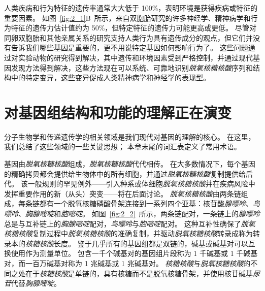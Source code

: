 人类疾病和行为特征的遗传率通常大大低于 100\%，表明环境是获得疾病或特征的重要因素。
如图~\ref{fig:2_1}B~所示，来自双胞胎研究的许多神经学、精神病学和行为特征的遗传力估计值约为 50\%，但特定特征的遗传力可能更高或更低。
尽管对同卵双胞胎和其他亲属关系的研究支持人类行为具有遗传成分的观点，但它们并没有告诉我们哪些基因是重要的，更不用说特定基因如何影响行为了。
这些问题通过对实验动物的研究得到解决，其中遗传和环境因素受到严格控制，并通过现代基因发现方法得到解决，这些方法现在可以系统、可靠地识别\textit{脱氧核糖核酸}序列和结构中的特定变异，这些变异促成人类精神病学和神经学的表现型。



\section{对基因组结构和功能的理解正在演变}

分子生物学和传递遗传学的相关领域是我们现代对基因的理解的核心。
在这里，我们总结了这些领域的一些关键思想；
本章末尾的词汇表定义了常用术语。


基因由\textit{脱氧核糖核酸}组成，\textit{脱氧核糖核酸}代代相传。
在大多数情况下，每个基因的精确拷贝都会提供给生物体中的所有细胞，并通过\textit{脱氧核糖核酸}复制提供给后代。
该一般规则的罕见例外——引入种系或体细胞\textit{脱氧核糖核酸}并在疾病风险中发挥重要作用的新（从头）突变——将在后面讨论。
\textit{脱氧核糖核酸}由两条链组成，每条链都有一个脱氧核糖磷酸骨架连接到一系列四个亚基：核苷酸\textit{腺嘌呤}、\textit{鸟嘌呤}、\textit{胸腺嘧啶}和\textit{胞嘧啶}。
如图~\ref{fig:2_2}~所示，两条链配对，一条链上的\textit{腺嘌呤}总是与互补链上的\textit{胸腺嘧啶}配对，\textit{鸟嘌呤}与\textit{胞嘧啶}配对。
这种互补性确保了\textit{脱氧核糖核酸}复制过程中\textit{脱氧核糖核酸}的准确复制，并驱动\textit{脱氧核糖核酸}转录成称为转录本的\textit{核糖核酸}长度。
鉴于几乎所有的基因组都是双链的，碱基或碱基对可以互换使用作为测量单位。
包含一千个碱基对的基因组片段称为 1 千碱基或 1 千碱基对，而一百万碱基对称为 1 兆碱基或 1 兆碱基对。
\textit{核糖核酸}与\textit{脱氧核糖核酸}的不同之处在于\textit{核糖核酸}是单链的，具有核糖而不是脱氧核糖骨架，并使用核苷碱基\textit{尿苷}代替\textit{胸腺嘧啶}。


